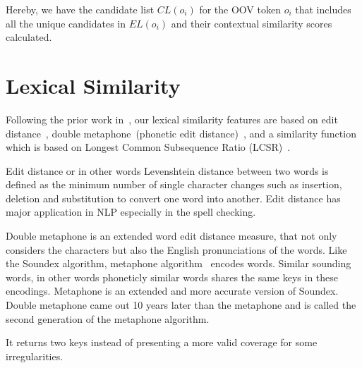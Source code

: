 \documentclass[a4paper,onesided,12pt]{report}
\begin{document}
Hereby, we have the candidate list $CL(o_{i})$ for the OOV token $o_i$ that includes all the unique candidates in $EL(o_{i})$ and their contextual similarity scores calculated.

\section{Lexical Similarity}

Following the prior work in~\cite{Han:2011:LNS:2002472.2002520,DBLP:conf/acl/HassanM13}, our lexical similarity features are based on edit distance~\cite{levenshtein1966bcc}, double metaphone~(phonetic edit distance)~\cite{Philips:2000:DMS:349124.349132}, and a similarity function~\cite{Contractor:2010:UCN:1944566.1944588} which is based on Longest Common Subsequence Ratio (LCSR)~\cite{melamed1999bitext}.

Edit distance or in other words Levenshtein distance between two words is defined as the minimum number of single character changes such as insertion, deletion and substitution to convert one word into another. Edit distance has major application in NLP especially in the spell checking.

Double metaphone is an extended word edit distance measure, that not only considers the characters but also the English pronunciations of the words. Like the Soundex algorithm, metaphone algorithm~\cite{philips1990hanging} encodes words. Similar sounding words, in other words phoneticly similar words shares the same keys in these encodings. Metaphone is an extended and more accurate version of Soundex. Double metaphone came out 10 years later than the metaphone and is called the second generation of the metaphone algorithm.

It returns two keys instead of presenting a more valid coverage for some irregularities. %
\end{document}
